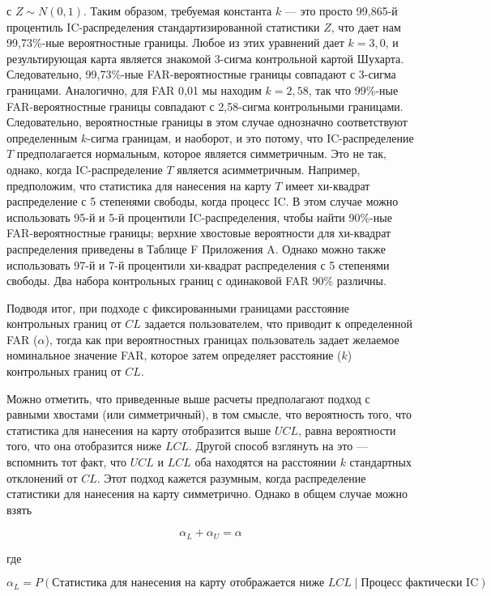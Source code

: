 с \(Z \sim N(0,1)\). Таким образом, требуемая константа \(k\) — это просто 99,865-й процентиль IC-распределения стандартизированной статистики \(Z\), что дает нам 99,73\%-ные вероятностные границы. Любое из этих уравнений дает \(k = 3,0\), и результирующая карта является знакомой 3-сигма контрольной картой Шухарта. Следовательно, 99,73\%-ные FAR-вероятностные границы совпадают с 3-сигма границами. Аналогично, для FAR 0,01 мы находим \(k = 2,58\), так что 99\%-ные FAR-вероятностные границы совпадают с 2,58-сигма контрольными границами. Следовательно, вероятностные границы в этом случае однозначно соответствуют определенным \(k\)-сигма границам, и наоборот, и это потому, что IC-распределение \(T\) предполагается нормальным, которое является симметричным. Это не так, однако, когда IC-распределение \(T\) является асимметричным. Например, предположим, что статистика для нанесения на карту \(T\) имеет хи-квадрат распределение с 5 степенями свободы, когда процесс IC. В этом случае можно использовать 95-й и 5-й процентили IC-распределения, чтобы найти 90\%-ные FAR-вероятностные границы; верхние хвостовые вероятности для хи-квадрат распределения приведены в Таблице F Приложения A. Однако можно также использовать 97-й и 7-й процентили хи-квадрат распределения с 5 степенями свободы. Два набора контрольных границ с одинаковой FAR 90\% различны.

Подводя итог, при подходе с фиксированными границами расстояние контрольных границ от \(CL\) задается пользователем, что приводит к определенной FAR (\(\alpha\)), тогда как при вероятностных границах пользователь задает желаемое номинальное значение FAR, которое затем определяет расстояние (\(k\)) контрольных границ от \(CL\).

Можно отметить, что приведенные выше расчеты предполагают подход с равными хвостами (или симметричный), в том смысле, что вероятность того, что статистика для нанесения на карту отобразится выше \(UCL\), равна вероятности того, что она отобразится ниже \(LCL\). Другой способ взглянуть на это — вспомнить тот факт, что \(UCL\) и \(LCL\) оба находятся на расстоянии \(k\) стандартных отклонений от \(CL\). Этот подход кажется разумным, когда распределение статистики для нанесения на карту симметрично. Однако в общем случае можно взять

\[
\alpha_L + \alpha_U = \alpha
\]

где

\[
\alpha_L = P(\text{Статистика для нанесения на карту отображается ниже } LCL \mid \text{Процесс фактически IC})
\]

